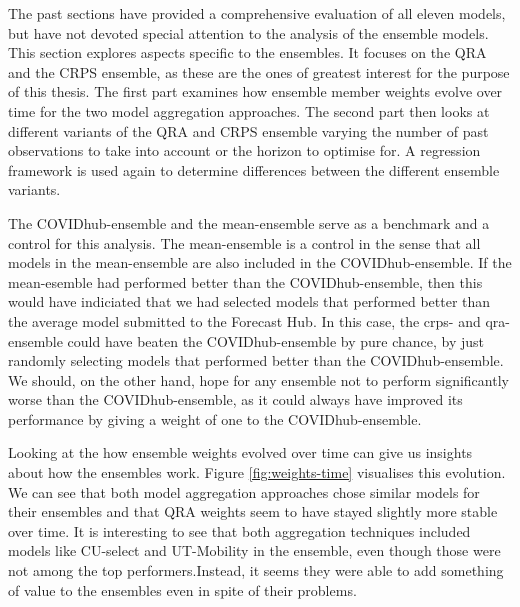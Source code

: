 \documentclass[
]{book}
\begin{document}
The past sections have provided a comprehensive evaluation of all eleven models, but have not devoted special attention to the analysis of the ensemble models. This section explores aspects specific to the ensembles. It focuses on the QRA and the CRPS ensemble, as these are the ones of greatest interest for the purpose of this thesis. The first part examines how ensemble member weights evolve over time for the two model aggregation approaches. The second part then looks at different variants of the QRA and CRPS ensemble varying the number of past observations to take into account or the horizon to optimise for. A regression framework is used again to determine differences between the different ensemble variants.

The COVIDhub-ensemble and the mean-ensemble serve as a benchmark and a control for this analysis. The mean-ensemble is a control in the sense that all models in the mean-ensemble are also included in the COVIDhub-ensemble. If the mean-esemble had performed better than the COVIDhub-ensemble, then this would have indiciated that we had selected models that performed better than the average model submitted to the Forecast Hub. In this case, the crps- and qra-ensemble could have beaten the COVIDhub-ensemble by pure chance, by just randomly selecting models that performed better than the COVIDhub-ensemble. We should, on the other hand, hope for any ensemble not to perform significantly worse than the COVIDhub-ensemble, as it could always have improved its performance by giving a weight of one to the COVIDhub-ensemble.

Looking at the how ensemble weights evolved over time can give us insights about how the ensembles work. Figure \ref{fig:weights-time} visualises this evolution. We can see that both model aggregation approaches chose similar models for their ensembles and that QRA weights seem to have stayed slightly more stable over time. It is interesting to see that both aggregation techniques included models like CU-select and UT-Mobility in the ensemble, even though those were not among the top performers.Instead, it seems they were able to add something of value to the ensembles even in spite of their problems.
\end{document}
